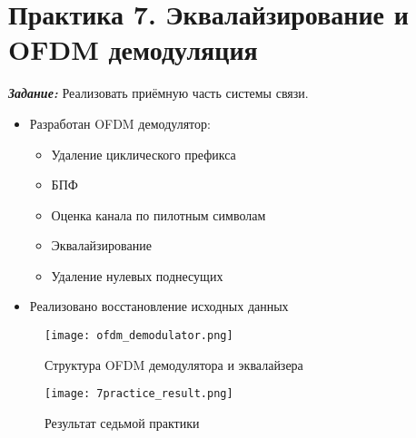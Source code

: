 \chapter*{Практика 7. Эквалайзирование и OFDM демодуляция}
\label{ch:7_practice}

\textit{\textbf{Задание:}} Реализовать приёмную часть системы связи.

\begin{itemize}
    \item Разработан OFDM демодулятор:
    \begin{itemize}
        \item Удаление циклического префикса
        \item БПФ
        \item Оценка канала по пилотным символам
        \item Эквалайзирование
        \item Удаление нулевых поднесущих
    \end{itemize}
    \item Реализовано восстановление исходных данных
\end{itemize}

\begin{figure}[ht]
    \centering
    \texttt{[image: ofdm\_demodulator.png]}
    \caption{Структура OFDM демодулятора и эквалайзера}
    \label{fig:ofdm_demodulator}
\end{figure}

\begin{figure}[ht]
    \centering
    \texttt{[image: 7practice\_result.png]}
    \caption{Результат седьмой практики}
    \label{fig:7practice_result}
\end{figure}
